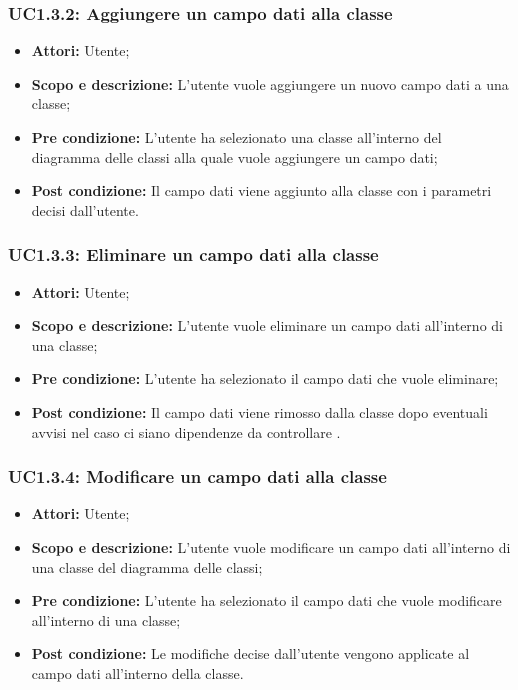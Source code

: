 \documentclass[a4paper]{report}
\begin{document}
\subsubsection{UC1.3.2: Aggiungere un campo dati alla classe}
\begin{itemize}
	\item \textbf{Attori:} Utente;
	\item \textbf{Scopo e descrizione: }L'utente vuole aggiungere un nuovo campo dati a una classe;
	\item \textbf{Pre condizione: }L'utente ha selezionato una classe all'interno del diagramma delle classi alla quale vuole aggiungere un campo dati;
	\item \textbf{Post condizione: }Il campo dati viene aggiunto alla classe con i parametri decisi dall'utente.
\end{itemize}

\subsubsection{UC1.3.3: Eliminare un campo dati alla classe}
\begin{itemize}
	\item \textbf{Attori:} Utente;
	\item \textbf{Scopo e descrizione: }L'utente vuole eliminare un campo dati all'interno di una classe;
	\item \textbf{Pre condizione: }L'utente ha selezionato il campo dati che vuole eliminare;
	\item \textbf{Post condizione: }Il campo dati viene rimosso dalla classe dopo eventuali avvisi nel caso ci siano dipendenze da controllare .
\end{itemize}

\subsubsection{UC1.3.4: Modificare un campo dati alla classe}
\begin{itemize}
	\item \textbf{Attori:} Utente;
	\item \textbf{Scopo e descrizione: }L'utente vuole modificare un campo dati all'interno di una classe del diagramma delle classi;
	\item \textbf{Pre condizione: }L'utente ha selezionato il campo dati che vuole modificare all'interno di una classe;
	\item \textbf{Post condizione: }Le modifiche decise dall'utente vengono applicate al campo dati all'interno della classe.
\end{itemize}
\end{document}
